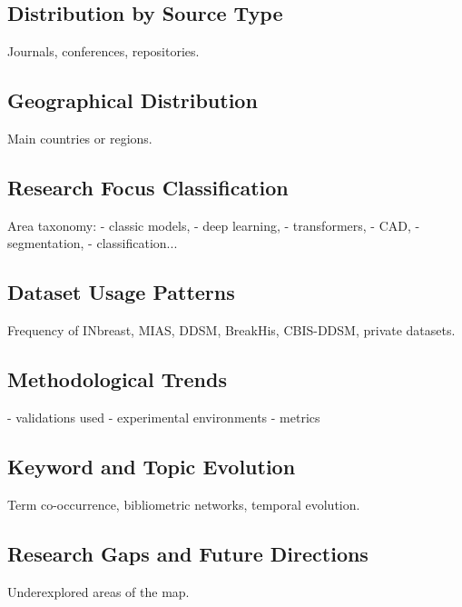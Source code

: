 \subsection{Distribution by Source Type}
Journals, conferences, repositories.

\subsection{Geographical Distribution}
Main countries or regions.

\subsection{Research Focus Classification}
Area taxonomy:
- classic models,
- deep learning,
- transformers,
- CAD,
- segmentation,
- classification...

\subsection{Dataset Usage Patterns}
Frequency of INbreast, MIAS, DDSM, BreakHis, CBIS-DDSM, private datasets.

\subsection{Methodological Trends}
- validations used  
- experimental environments  
- metrics  

\subsection{Keyword and Topic Evolution}
Term co-occurrence, bibliometric networks, temporal evolution.

\subsection{Research Gaps and Future Directions}
Underexplored areas of the map.


